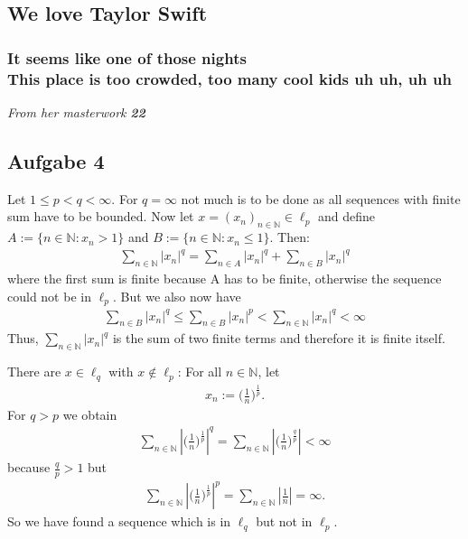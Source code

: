 \documentclass[a4paper]{article}
\renewcommand{\hline}{\noindent\makebox[\linewidth]{\rule{12cm}{1pt}}}
\newcommand{\vip}[1]{\textit{\textbf{#1}}}
\begin{document}
\subsection*{We love Taylor Swift}
\subsubsection*{It seems like one of those nights\\
This place is too crowded, too many cool kids uh uh, uh uh}
{\color{grey}\emph{From her masterwork }\vip{22}}

\hline 

\subsection*{Aufgabe 4}

Let $1\leq p< q< \infty$. For $q=\infty$ not much is to be done as all sequences with finite sum have to be bounded. Now let $x = (x_n)_{n\in\mathbb N}\in \ell_p$ and define $A:=\{n\in\mathbb N: x_n>1\}$ and $B:=\{n\in\mathbb N: x_n\leq 1\}$. Then:
\begin{align*}
    \sum_{n\in\mathbb N} |x_n|^q = \sum_{n\in A} |x_n|^q + \sum_{n\in B} |x_n|^q
\end{align*}
where the first sum is finite because A has to be finite, otherwise the sequence could not be in $\ell_p$. But we also now have
\begin{align*}
    \sum_{n\in B} |x_n|^q \leq \sum_{n\in B} |x_n|^p < \sum_{n\in \mathbb N} |x_n|^q < \infty
\end{align*}
Thus, $\sum_{n\in \mathbb N} |x_n|^q$ is the sum of two finite terms and therefore it is finite itself.

There are $x\in\ell_q$ with $x\not \in \ell_p$: For all $n\in\mathbb N$, let \begin{align*}x_n := \Big(\frac{1}{n}\Big)^{\frac{1}{p}}.\end{align*}
For $q>p$ we obtain 
\begin{align*}
    \sum_{n\in\mathbb N} |\Big(\frac{1}{n}\Big)^{\frac{1}{p}}|^q = 
    \sum_{n\in\mathbb N} |\Big(\frac{1}{n}\Big)^{\frac{q}{p}}|<\infty
\end{align*}
because $\frac{q}{p}>1$ but
\begin{align*}
    \sum_{n\in\mathbb N} |\Big(\frac{1}{n}\Big)^{\frac{1}{p}}|^p = 
    \sum_{n\in\mathbb N} |\frac{1}{n}| = \infty.
\end{align*}
So we have found a sequence which is in $\ell_q$ but not in $\ell_p$.
\end{document}
